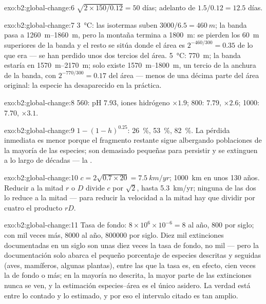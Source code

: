 \begin{solution}{exo:b2:global-change:6}
$\sqrt{2\times 150/0.12} = 50$ días; adelanto de $1.5/0.12 = 12.5$
días.
\end{solution}

\begin{solution}{exo:b2:global-change:7}
\qty{3}{\celsius}: las isotermas suben $3000/6.5 = \qty{460}{m}$; la
banda pasa a \qtyrange{1260}{1860}{m}, pero la montaña termina a
\qty{1800}{m}: se pierden los \qty{60}{m} superiores de la banda y el resto
se sitúa donde el área es $2^{-460/300} = 0.35$ de lo que era --- se han
perdido unos dos tercios del área. \qty{5}{\celsius}: \qty{770}{m}; la
banda estaría en \qtyrange{1570}{2170}{m}; solo existe
\qtyrange{1570}{1800}{m}, un tercio de la anchura de la banda, con
$2^{-770/300} = 0.17$ del área --- menos de una décima parte del área
original: la especie ha desaparecido en la práctica.
\end{solution}

\begin{solution}{exo:b2:global-change:8}
560: pH $7.93$, iones hidrógeno $\times 1.9$; 800: $7.79$, $\times
2.6$; 1000: $7.70$, $\times 3.1$.
\end{solution}

\begin{solution}{exo:b2:global-change:9}
$1 - (1 - h)^{0.25}$: \qty{26}{\%}, \qty{53}{\%}, \qty{82}{\%}. La
pérdida inmediata es menor porque el fragmento restante sigue albergando
poblaciones de la mayoría de las especies; son demasiado pequeñas para
persistir y se extinguen a lo largo de décadas --- la .
\end{solution}

\begin{solution}{exo:b2:global-change:10}
$c = 2\sqrt{0.7\times 20} = \qty{7.5}{km/yr}$; \qty{1000}{km} en unos
130 años. Reducir a la mitad $r$ o $D$ divide $c$ por
$\sqrt 2$, hasta \qty{5.3}{km/yr}; ninguna de las dos lo reduce a la mitad
--- para reducir la velocidad a la mitad hay que dividir por cuatro el
producto $rD$.
\end{solution}

\begin{solution}{exo:b2:global-change:11}
Tasa de fondo: $8\times 10^{6}\times 10^{-6} = 8$ al año, 800 por siglo;
con mil veces más, 8000 al año, \num{800000} por siglo. Diez mil
extinciones documentadas en un siglo son unas diez veces la tasa de fondo,
no mil --- pero la documentación solo abarca el pequeño porcentaje de
especies descritas y seguidas (aves, mamíferos, algunas plantas), entre las
que la tasa es, en efecto, cien veces la de fondo o más; en la mayoría no
descrita, la mayor parte de las extinciones nunca se ven, y la estimación
especies--área es el único asidero. La verdad está entre lo contado y lo
estimado, y por eso el intervalo citado es tan amplio.
\end{solution}

